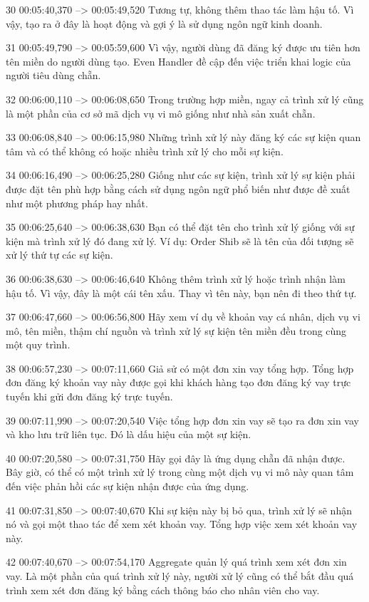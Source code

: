 30
00:05:40,370 --> 00:05:49,520
Tương tự, không thêm thao tác làm hậu tố.  Vì vậy, tạo ra ở đây là hoạt động và gợi ý là sử dụng ngôn ngữ kinh doanh.

31
00:05:49,790 --> 00:05:59,600
Vì vậy, người dùng đã đăng ký được ưu tiên hơn tên miền do người dùng tạo.  Even Handler đề cập đến việc triển khai logic của người tiêu dùng chẵn.

32
00:06:00,110 --> 00:06:08,650
Trong trường hợp miền, ngay cả trình xử lý cũng là một phần của cơ sở mã dịch vụ vi mô giống như nhà sản xuất chẵn.

33
00:06:08,840 --> 00:06:15,980
Những trình xử lý này đăng ký các sự kiện quan tâm và có thể không có hoặc nhiều trình xử lý cho mỗi sự kiện.

34
00:06:16,490 --> 00:06:25,280
Giống như các sự kiện, trình xử lý sự kiện phải được đặt tên phù hợp bằng cách sử dụng ngôn ngữ phổ biến như được đề xuất như một phương pháp hay nhất.

35
00:06:25,640 --> 00:06:38,630
Bạn có thể đặt tên cho trình xử lý giống với sự kiện mà trình xử lý đó đang xử lý.  Ví dụ: Order Shib sẽ là tên của đối tượng sẽ xử lý thứ tự các sự kiện.

36
00:06:38,630 --> 00:06:46,640
Không thêm trình xử lý hoặc trình nhận làm hậu tố.  Vì vậy, đây là một cái tên xấu.  Thay vì tên này, bạn nên đi theo thứ tự.

37
00:06:47,660 --> 00:06:56,800
Hãy xem ví dụ về khoản vay cá nhân, dịch vụ vi mô, tên miền, thậm chí nguồn và trình xử lý sự kiện tên miền đều trong cùng một quy trình.

38
00:06:57,230 --> 00:07:11,660
Giả sử có một đơn xin vay tổng hợp.  Tổng hợp đơn đăng ký khoản vay này được gọi khi khách hàng tạo đơn đăng ký vay trực tuyến khi gửi đơn đăng ký trực tuyến.

39
00:07:11,990 --> 00:07:20,540
Việc tổng hợp đơn xin vay sẽ tạo ra đơn xin vay và kho lưu trữ liên tục.  Đó là dấu hiệu của một sự kiện.

40
00:07:20,580 --> 00:07:31,750
Hãy gọi đây là ứng dụng chẵn đã nhận được.  Bây giờ, có thể có một trình xử lý trong cùng một dịch vụ vi mô này quan tâm đến việc phản hồi các sự kiện nhận được của ứng dụng.

41
00:07:31,850 --> 00:07:40,670
Khi sự kiện này bị bỏ qua, trình xử lý sẽ nhận nó và gọi một thao tác để xem xét khoản vay.  Tổng hợp việc xem xét khoản vay này.

42
00:07:40,670 --> 00:07:54,170
Aggregate quản lý quá trình xem xét đơn xin vay.  Là một phần của quá trình xử lý này, người xử lý cũng có thể bắt đầu quá trình xem xét đơn đăng ký bằng cách thông báo cho nhân viên cho vay.

